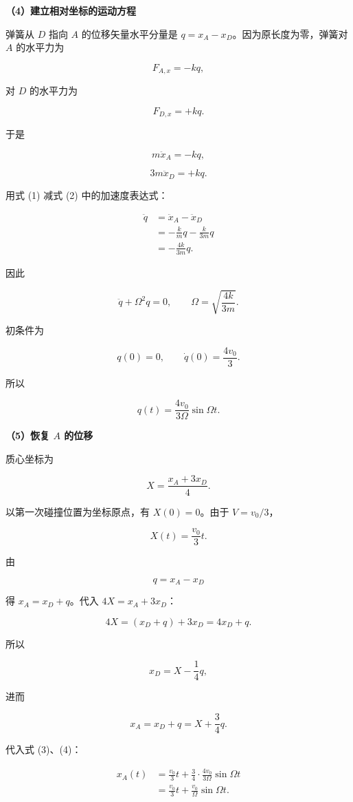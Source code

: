 \documentclass[12pt,a4paper,UTF8]{ctexart}
\begin{document}
\textbf{（4）建立相对坐标的运动方程}

弹簧从 \(D\) 指向 \(A\) 的位移矢量水平分量是
\(q=x_A-x_D\)。因为原长度为零，弹簧对 \(A\) 的水平力为

\[F_{A,x}=-kq,\]

对 \(D\) 的水平力为

\[F_{D,x}=+kq.\]

于是

\[
m\ddot x_A=-kq, \tag{1}
\]

\[
3m\ddot x_D=+kq. \tag{2}
\]

用式 (1) 减式 (2) 中的加速度表达式：

\[
\begin{aligned}
\ddot q
&=\ddot x_A-\ddot x_D\\
&=-\frac{k}{m}q-\frac{k}{3m}q\\
&=-\frac{4k}{3m}q.
\end{aligned}
\]

因此

\[
\ddot q+\Omega^2q=0,
\qquad
\boxed{\Omega=\sqrt{\frac{4k}{3m}}}.
\]

初条件为

\[q(0)=0,
\qquad
\dot q(0)=\frac{4v_0}{3}.
\]

所以

\[
q(t)=\frac{4v_0}{3\Omega}\sin\Omega t. \tag{3}
\]

\textbf{（5）恢复 \(A\) 的位移}

质心坐标为

\[
X=\frac{x_A+3x_D}{4}.
\]

以第一次碰撞位置为坐标原点，有 \(X(0)=0\)。由于 \(V=v_0/3\)，

\[
X(t)=\frac{v_0}{3}t. \tag{4}
\]

由

\[q=x_A-x_D\]

得 \(x_A=x_D+q\)。代入 \(4X=x_A+3x_D\)：

\[
4X=(x_D+q)+3x_D=4x_D+q.
\]

所以

\[x_D=X-\frac14q,\]

进而

\[
x_A=x_D+q=X+\frac34q.
\]

代入式 (3)、(4)：

\[
\begin{aligned}
x_A(t)
&=\frac{v_0}{3}t
+\frac34\cdot\frac{4v_0}{3\Omega}\sin\Omega t\\
&=\frac{v_0}{3}t+\frac{v_0}{\Omega}\sin\Omega t.
\end{aligned}
\]
\end{document}
